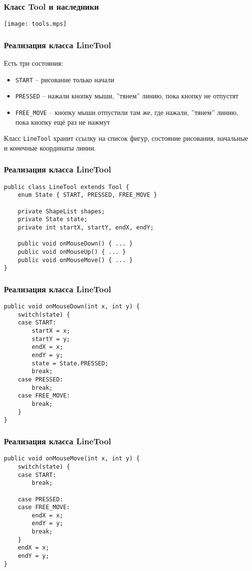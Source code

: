\documentclass[handout]{beamer}
\begin{document}
\begin{frame}[fragile]
\frametitle{Класс Tool и наследники}
\begin{center}
\texttt{[image: tools.mps]}
\end{center}
\end{frame}


\begin{frame}[fragile]
\frametitle{Реализация класса LineTool}
Есть три состояния:
\begin{itemize}
\item \lstinline{START} -- рисование только начали
\item \lstinline{PRESSED} -- нажали кнопку мыши, ''тянем'' линию, пока
   	  кнопку не отпустят
\item \lstinline{FREE_MOVE} -- кнопку мыши отпустили там же, где нажали,
   	 ''тянем'' линию, пока кнопку ещё раз не нажмут
\end{itemize}
\vspace{1cm}
Класс \lstinline{LineTool} хранит ссылку на список фигур, состояние
рисования, начальные и конечные координаты линии.
\end{frame}


\begin{frame}[fragile]
\frametitle{Реализация класса LineTool}
\begin{lstlisting}
public class LineTool extends Tool {
    enum State { START, PRESSED, FREE_MOVE }
    
    private ShapeList shapes;
    private State state;
    private int startX, startY, endX, endY;
    
    public void onMouseDown() { ... }
    public void onMouseUp() { ... }
    public void onMouseMove() { ... }
}
\end{lstlisting}
\end{frame}


\begin{frame}[fragile]
\frametitle{Реализация класса LineTool}
\begin{lstlisting}
public void onMouseDown(int x, int y) {
    switch(state) {
    case START:
        startX = x;
        startY = y;
        endX = x;
        endY = y;
        state = State.PRESSED;
        break;
    case PRESSED:
        break;
    case FREE_MOVE:
        break;
    }
}
\end{lstlisting}
\end{frame}


\begin{frame}[fragile]
\frametitle{Реализация класса LineTool}
\begin{lstlisting}
public void onMouseMove(int x, int y) {
    switch(state) {
    case START:
        break;

    case PRESSED:
    case FREE_MOVE:
        endX = x;
        endY = y;
        break;
    }
    endX = x;
    endY = y;
}
\end{lstlisting}
\end{frame}
\end{document}
